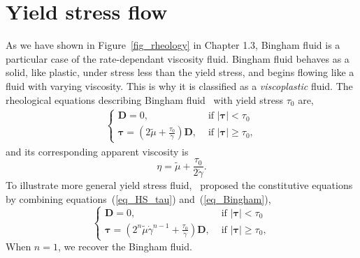 \section{Yield stress flow}
As we have shown in Figure~\ref{fig_rheology} in Chapter 1.3, Bingham fluid is a particular case of the rate-dependant viscosity fluid. 
Bingham fluid behaves as a solid, like plastic, under stress less than the yield stress, and begins flowing like a fluid with varying viscosity. 
This is why it is classified as a \textit{viscoplastic} fluid.
The rheological equations describing Bingham fluid~\cite{bingham_investigation_1917} with yield stress $\tau_0$ are,
\begin{align}
  \left\{\begin{matrix}
 {\bm D} =0, & \text { if } |{\bm \tau} | <\tau_0 \\
  {\bm \tau}  = 
\left(2 \tilde{\mu} + \frac{\tau_0}{ \dot{\gamma}}\right) {\bm D} , & \text { if } |{\bm \tau}|\geq \tau_0,
\end{matrix}\right.
\label{eq_Bingham}
  \end{align}
and its corresponding apparent viscosity is
\begin{equation}
  \eta=\tilde{\mu} +\frac{\tau_0}{2 \dot{\gamma}}.
  \end{equation}
  To illustrate more general yield stress fluid,~\cite{sverdrup_highly_2018} proposed the constitutive equations by combining equations~(\ref{eq_HS_tau}) and~(\ref{eq_Bingham}),
  \begin{equation}
    \left\{\begin{matrix}
  {\bm D }=0, 
    & \text { if } |{\bm \tau}| < \tau_0 
    \\
    {\bm \tau}  =
    \left(2^n \tilde{\mu} \dot{\gamma}^{n-1} + \frac{\tau_0}{ \dot{\gamma}}\right) {\bm D}, 
    & \text { if } |{\bm \tau}|  \geq \tau_0,
  \end{matrix}\right. 
  \label{eq_HS_B}
   \end{equation}
When $n = 1$, we recover the Bingham fluid.

